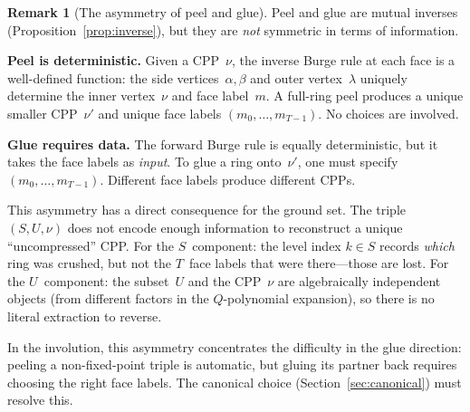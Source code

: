\documentclass[11pt]{article}
\theoremstyle{plain}
\theoremstyle{definition}
\newtheorem{remark}[theorem]{Remark}
\begin{document}
\begin{remark}[The asymmetry of peel and glue]
\label{rmk:asymmetry}
Peel and glue are mutual inverses (Proposition~\ref{prop:inverse}),
but they are \emph{not} symmetric in terms of information.

\textbf{Peel is deterministic.}\;
Given a CPP~$\nu$, the inverse Burge rule at each face is a
well-defined function: the side vertices~$\alpha, \beta$ and outer
vertex~$\lambda$ uniquely determine the inner vertex~$\nu$ and face
label~$m$.  A full-ring peel produces a unique smaller
CPP~$\nu'$ and unique face labels $(m_0, \ldots, m_{T-1})$.
No choices are involved.

\textbf{Glue requires data.}\;
The forward Burge rule is equally deterministic, but it takes the
face labels as \emph{input}.  To glue a ring onto~$\nu'$, one must
specify $(m_0, \ldots, m_{T-1})$.  Different face labels produce
different CPPs.

This asymmetry has a direct consequence for the ground set.  The
triple $(S, U, \nu)$ does not encode enough information to
reconstruct a unique ``uncompressed'' CPP\@.  For the $S$~component:
the level index $k \in S$ records \emph{which} ring was crushed, but
not the $T$~face labels that were there---those are lost.  For
the $U$~component: the subset~$U$ and the CPP~$\nu$ are
algebraically independent objects (from different factors in the
$Q$-polynomial expansion), so there is no literal extraction to
reverse.

In the involution, this asymmetry concentrates the difficulty
in the glue direction: peeling a non-fixed-point triple is
automatic, but gluing its partner back requires choosing the
right face labels.  The canonical choice
(Section~\ref{sec:canonical}) must resolve this.
\end{remark}
\end{document}
